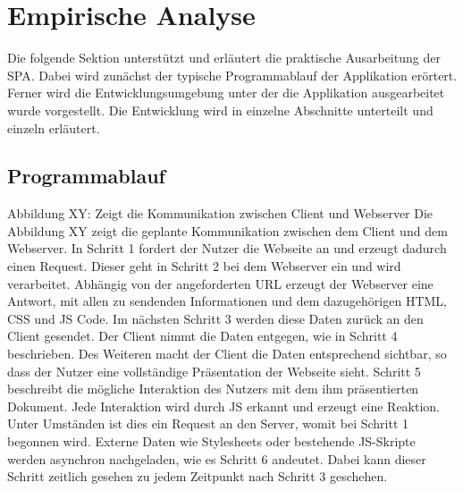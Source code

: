 \newpage
\section{Empirische Analyse}
\label{sec:Empirische Analyse}
Die folgende Sektion unterstützt und erläutert die praktische Ausarbeitung der \ac{SPA}. Dabei wird zunächst der typische Programmablauf der Applikation erörtert. Ferner wird die Entwicklungsumgebung unter der die Applikation ausgearbeitet wurde vorgestellt. Die Entwicklung wird in einzelne Abschnitte unterteilt und einzeln erläutert.

\subsection{Programmablauf}
\label{sec:Programmablauf}
Abbildung XY: Zeigt die Kommunikation zwischen Client und Webserver
Die Abbildung XY zeigt die geplante Kommunikation zwischen dem Client und dem Webserver.
In Schritt 1 fordert der Nutzer die Webseite an und erzeugt dadurch einen Request. Dieser geht in Schritt 2 bei dem Webserver ein und wird verarbeitet. Abhängig von der angeforderten URL erzeugt der Webserver eine Antwort, mit allen zu sendenden Informationen und dem dazugehörigen \ac{HTML}, \ac{CSS} und \ac{JS} Code. Im nächsten Schritt 3 werden diese Daten zurück an den Client gesendet. Der Client nimmt die Daten entgegen, wie in Schritt 4 beschrieben. Des Weiteren macht der Client die Daten entsprechend sichtbar, so dass der Nutzer eine vollständige Präsentation der Webseite sieht. Schritt 5 beschreibt die mögliche Interaktion des Nutzers mit dem ihm präsentierten Dokument. Jede Interaktion wird durch \ac{JS} erkannt und erzeugt eine Reaktion. Unter Umständen ist dies ein Request an den Server, womit bei Schritt 1 begonnen wird. Externe Daten wie Stylesheets oder bestehende \ac{JS}-Skripte  werden asynchron nachgeladen, wie es Schritt 6 andeutet. Dabei kann dieser Schritt zeitlich gesehen zu jedem Zeitpunkt nach Schritt 3 geschehen.


